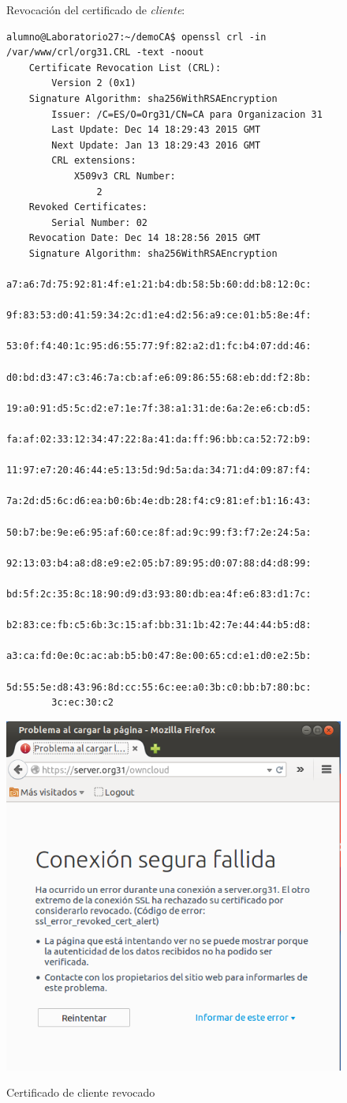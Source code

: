 \documentclass[]{article}
\begin{document}
\begin{figure}[h]
	Revocación del certificado de \textit{cliente}:
\begin{Verbatim}[frame=single]
alumno@Laboratorio27:~/demoCA$ openssl crl -in /var/www/crl/org31.CRL -text -noout 
	Certificate Revocation List (CRL):
		Version 2 (0x1)
	Signature Algorithm: sha256WithRSAEncryption
		Issuer: /C=ES/O=Org31/CN=CA para Organizacion 31
		Last Update: Dec 14 18:29:43 2015 GMT
		Next Update: Jan 13 18:29:43 2016 GMT
		CRL extensions:
			X509v3 CRL Number: 
				2
	Revoked Certificates:
		Serial Number: 02
	Revocation Date: Dec 14 18:28:56 2015 GMT
	Signature Algorithm: sha256WithRSAEncryption
		a7:a6:7d:75:92:81:4f:e1:21:b4:db:58:5b:60:dd:b8:12:0c:
		9f:83:53:d0:41:59:34:2c:d1:e4:d2:56:a9:ce:01:b5:8e:4f:
		53:0f:f4:40:1c:95:d6:55:77:9f:82:a2:d1:fc:b4:07:dd:46:
		d0:bd:d3:47:c3:46:7a:cb:af:e6:09:86:55:68:eb:dd:f2:8b:
		19:a0:91:d5:5c:d2:e7:1e:7f:38:a1:31:de:6a:2e:e6:cb:d5:
		fa:af:02:33:12:34:47:22:8a:41:da:ff:96:bb:ca:52:72:b9:
		11:97:e7:20:46:44:e5:13:5d:9d:5a:da:34:71:d4:09:87:f4:
		7a:2d:d5:6c:d6:ea:b0:6b:4e:db:28:f4:c9:81:ef:b1:16:43:
		50:b7:be:9e:e6:95:af:60:ce:8f:ad:9c:99:f3:f7:2e:24:5a:
		92:13:03:b4:a8:d8:e9:e2:05:b7:89:95:d0:07:88:d4:d8:99:
		bd:5f:2c:35:8c:18:90:d9:d3:93:80:db:ea:4f:e6:83:d1:7c:
		b2:83:ce:fb:c5:6b:3c:15:af:bb:31:1b:42:7e:44:44:b5:d8:
		a3:ca:fd:0e:0c:ac:ab:b5:b0:47:8e:00:65:cd:e1:d0:e2:5b:
		5d:55:5e:d8:43:96:8d:cc:55:6c:ee:a0:3b:c0:bb:b7:80:bc:
		3c:ec:30:c2
\end{Verbatim}
\end{figure}


\begin{figure}[h]
	\caption{Certificado de cliente revocado}
	\centering
	\includegraphics[scale=0.5]{images/certs/revoked.png}
	\label{fig:revoked}
\end{figure}
\end{document}
